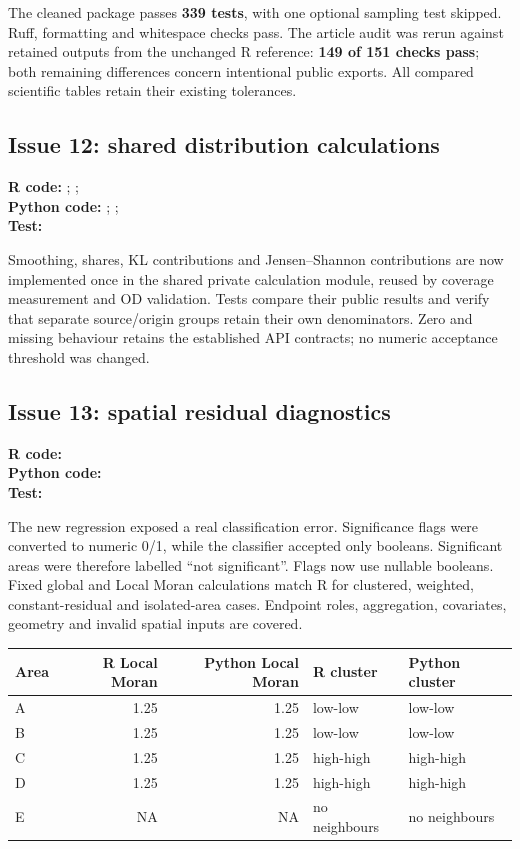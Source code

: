 \documentclass[10pt]{article}
\begin{document}
The cleaned package passes \textbf{339 tests}, with one optional sampling test
skipped. Ruff, formatting and whitespace checks pass. The article audit was
rerun against retained outputs from the unchanged R reference: \textbf{149 of 151 checks pass}; both
remaining differences concern intentional public exports. All compared
scientific tables retain their existing tolerances.

\subsection{Issue 12: shared distribution calculations}
{\footnotesize \textbf{R code:} ; ; \\ \textbf{Python code:} ; ; \\ \textbf{Test:} \par}


Smoothing, shares, KL contributions and Jensen--Shannon contributions are now
implemented once in the shared private calculation module, reused by coverage
measurement and OD validation. Tests compare their public results and verify
that separate source/origin groups retain their own denominators. Zero and
missing behaviour retains the established API contracts; no numeric acceptance
threshold was changed.

\subsection{Issue 13: spatial residual diagnostics}
{\footnotesize \textbf{R code:} \\ \textbf{Python code:} \\ \textbf{Test:} \par}


The new regression exposed a real classification error. Significance flags
were converted to numeric 0/1, while the classifier accepted only booleans.
Significant areas were therefore labelled ``not significant''. Flags now use
nullable booleans. Fixed global and Local Moran calculations match R for
clustered, weighted, constant-residual and isolated-area cases. Endpoint roles,
aggregation, covariates, geometry and invalid spatial inputs are covered.

\begin{tabularx}{\textwidth}{@{}lrrXX@{}}
\toprule
Area & R Local Moran & Python Local Moran & R cluster & Python cluster \\
\midrule
A & 1.25 & 1.25 & low-low & low-low \\
B & 1.25 & 1.25 & low-low & low-low \\
C & 1.25 & 1.25 & high-high & high-high \\
D & 1.25 & 1.25 & high-high & high-high \\
E & NA & NA & no neighbours & no neighbours \\
\bottomrule
\end{tabularx}
\end{document}

